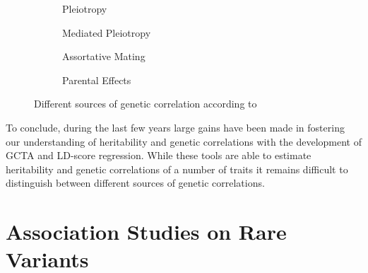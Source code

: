 \begin{figure}[htp]
  \begin{subfigure}[t]{0.4\textwidth}
    \centering
    \resizebox{0.5\linewidth}{!}{} 
    \caption{Pleiotropy}\label{fig:pleiotropy}
  \end{subfigure}
  \begin{subfigure}[t]{0.4\textwidth}
    \centering
    \resizebox{0.5\linewidth}{!}{} 
    \caption{Mediated Pleiotropy}\label{fig:mediated_pleiotropy}
  \end{subfigure}
  \begin{subfigure}[t]{0.4\textwidth}
    \centering
    \resizebox{0.6\linewidth}{!}{} 
    \caption{Assortative Mating}\label{fig:assortative_mating}
  \end{subfigure}
  \begin{subfigure}[t]{0.4\textwidth}
    \centering
    \resizebox{0.6\linewidth}{!}{}
    \caption{Parental Effects}\label{fig:parental_effects}
  \end{subfigure}
  \caption[Sources of Genetic Correlations]{Different sources of genetic correlation according to~\citet{Pickrell2016}}\label{fig:genetic_correlation}
\end{figure}

To conclude, during the last few years large gains have been made in fostering our understanding of heritability and genetic correlations with the development of GCTA and LD-score regression.
While these tools are able to estimate heritability and genetic correlations of a number of traits it remains difficult to distinguish between different sources of genetic correlations.

\section{Association Studies on Rare Variants}
\label{sec:association_studies_on_rare_varitants}

